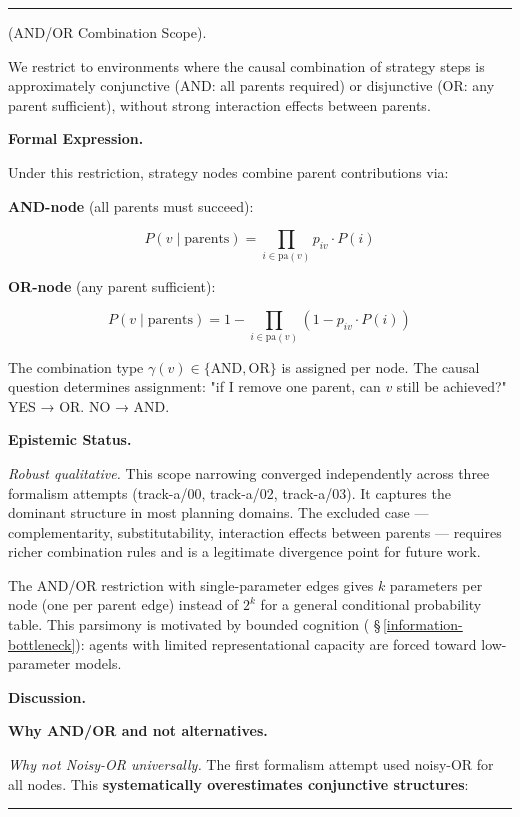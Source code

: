 \documentclass[11pt,oneside]{article}
\newcounter{claim}[section]
\renewcommand{\theclaim}{\thesection.\arabic{claim}}
\newenvironment{segment}[2]{%
  \refstepcounter{claim}%
  \bigskip\noindent\hrule\smallskip
  \noindent{\bfseries #1~\theclaim}\enskip(#2).\par\smallskip
  \noindent\ignorespaces
}{%
  \par\smallskip\noindent\hrule\bigskip
}
\newenvironment{scope}[1][]{\begin{segment}{Scope}{#1}}{\end{segment}}
\begin{document}
\begin{scope}[AND/OR Combination Scope]
\label{and-or-scope}
We restrict to environments where the causal combination of strategy steps is approximately conjunctive (AND: all parents required) or disjunctive (OR: any parent sufficient), without strong interaction effects between parents.



\medskip\noindent\textbf{Formal Expression.}



Under this restriction, strategy nodes combine parent contributions via:

\textbf{AND-node} (all parents must succeed):

$$P(v \mid \text{parents}) = \prod_{i \in \text{pa}(v)} p_{iv} \cdot P(i)$$

\textbf{OR-node} (any parent sufficient):

$$P(v \mid \text{parents}) = 1 - \prod_{i \in \text{pa}(v)} (1 - p_{iv} \cdot P(i))$$

The combination type $\gamma(v) \in \{\text{AND}, \text{OR}\}$ is assigned per node. The causal question determines assignment: "if I remove one parent, can $v$ still be achieved?" YES → OR. NO → AND.


\medskip\noindent\textbf{Epistemic Status.}


\textit{Robust qualitative.} This scope narrowing converged independently across three formalism attempts (track-a/00, track-a/02, track-a/03). It captures the dominant structure in most planning domains. The excluded case — complementarity, substitutability, interaction effects between parents — requires richer combination rules and is a legitimate divergence point for future work.

The AND/OR restriction with single-parameter edges gives $k$ parameters per node (one per parent edge) instead of $2^k$ for a general conditional probability table. This parsimony is motivated by bounded cognition ( \S\,\ref{information-bottleneck}): agents with limited representational capacity are forced toward low-parameter models.


\medskip\noindent\textbf{Discussion.}


\textbf{Why AND/OR and not alternatives.}

\textit{Why not Noisy-OR universally.} The first formalism attempt used noisy-OR for all nodes. This \textbf{systematically overestimates conjunctive structures}:


\end{scope}
\end{document}
